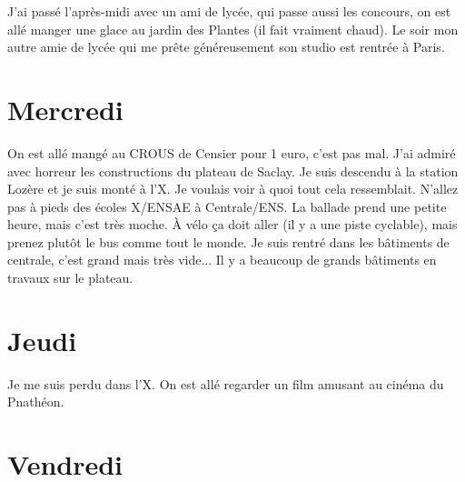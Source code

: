 \documentclass[french,a4paper, 12pt]{article}
\begin{document}
J'ai passé l'après-midi avec un ami de lycée, qui passe aussi les concours, on est allé manger une glace au jardin des Plantes (il fait vraiment chaud). Le soir mon autre amie de lycée qui me prête généreusement son studio est rentrée à Paris.

\section*{Mercredi}

On est allé mangé au CROUS de Censier pour 1 euro, c'est pas mal. J'ai admiré avec horreur les constructions du plateau de Saclay. Je suis descendu à la station Lozère et je suis monté à l'X. Je voulais voir à quoi tout cela ressemblait. N'allez pas à pieds des écoles X/ENSAE à Centrale/ENS. La ballade prend une petite heure, mais c'est très moche. À vélo ça doit aller (il y a une piste cyclable), mais prenez plutôt le bus comme tout le monde. Je suis rentré dans les bâtiments de centrale, c'est grand mais très vide... Il y a beaucoup de grands bâtiments en travaux sur le plateau. 

\section*{Jeudi}

Je me suis perdu dans l'X. On est allé regarder un film amusant au cinéma du Pnathéon.

\section*{Vendredi}
\end{document}
